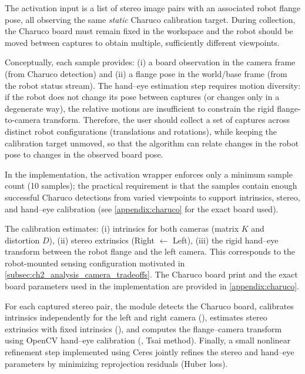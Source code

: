 The activation input is a list of stereo image pairs with an associated robot flange pose, all observing the same \emph{static} Charuco calibration target.
During collection, the Charuco board must remain fixed in the workspace and the robot should be moved between captures to obtain multiple, sufficiently different viewpoints.

Conceptually, each sample provides:
(i) a board observation in the camera frame (from Charuco detection) and
(ii) a flange pose in the world/base frame (from the robot status stream).
The hand--eye estimation step requires motion diversity: if the robot does not change its pose between captures (or changes only in a degenerate way), the relative motions are insufficient to constrain the rigid flange-to-camera transform.
Therefore, the user should collect a set of captures across distinct robot configurations (translations and rotations), while keeping the calibration target unmoved, so that the algorithm can relate changes in the robot pose to changes in the observed board pose.

In the implementation, the activation wrapper enforces only a minimum sample count (10 samples); the practical requirement is that the samples contain enough successful Charuco detections from varied viewpoints to support intrinsics, stereo, and hand--eye calibration (see \autoref{appendix:charuco} for the exact board used).

The calibration estimates:
(i) intrinsics for both cameras (matrix $K$ and distortion $D$),
(ii) stereo extrinsics (Right $\leftarrow$ Left),
(iii) the rigid hand--eye transform between the robot flange and the left camera.
This corresponds to the robot-mounted sensing configuration motivated in \autoref{subsec:ch2_analysis_camera_tradeoffs}. The Charuco board print and the exact board parameters used in the implementation are provided in \autoref{appendix:charuco}.

For each captured stereo pair, the module detects the Charuco board, calibrates intrinsics independently for the left and right camera (), estimates stereo extrinsics with fixed intrinsics (), and computes the flange--camera transform using OpenCV hand--eye calibration (, Tsai method). Finally, a small nonlinear refinement step implemented using Ceres jointly refines the stereo and hand--eye parameters by minimizing reprojection residuals (Huber loss).

